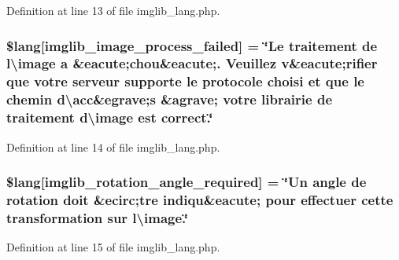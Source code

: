 Definition at line 13 of file imglib\+\_\+lang.\+php.

\subsubsection[{\texorpdfstring{\$lang}{$lang}}]{\setlength{\rightskip}{0pt plus 5cm}\$lang\mbox{[}\textquotesingle{}imglib\+\_\+image\+\_\+process\+\_\+failed\textquotesingle{}\mbox{]} = \char`\"{}Le traitement de l\textbackslash{}\textquotesingle{}image {\bf a} \&eacute;chou\&eacute;. Veuillez {\bf v}\&eacute;rifier que votre serveur supporte le protocole choisi et que le chemin d\textbackslash{}\textquotesingle{}acc\&egrave;{\bf s} \&agrave; votre librairie de traitement d\textbackslash{}\textquotesingle{}image est correct.\char`\"{}}\hypertarget{application_2language_2french_2imglib__lang_8php_a9ac6659eb97dd12e5c714cc9635cf22e}{}\label{application_2language_2french_2imglib__lang_8php_a9ac6659eb97dd12e5c714cc9635cf22e}


Definition at line 14 of file imglib\+\_\+lang.\+php.

\subsubsection[{\texorpdfstring{\$lang}{$lang}}]{\setlength{\rightskip}{0pt plus 5cm}\$lang\mbox{[}\textquotesingle{}imglib\+\_\+rotation\+\_\+angle\+\_\+required\textquotesingle{}\mbox{]} = \char`\"{}Un angle de rotation doit \&ecirc;tre indiqu\&eacute; pour effectuer cette transformation sur l\textbackslash{}\textquotesingle{}image.\char`\"{}}\hypertarget{application_2language_2french_2imglib__lang_8php_a1110d59ea8fd0564e78068dbda3438fb}{}\label{application_2language_2french_2imglib__lang_8php_a1110d59ea8fd0564e78068dbda3438fb}


Definition at line 15 of file imglib\+\_\+lang.\+php.

